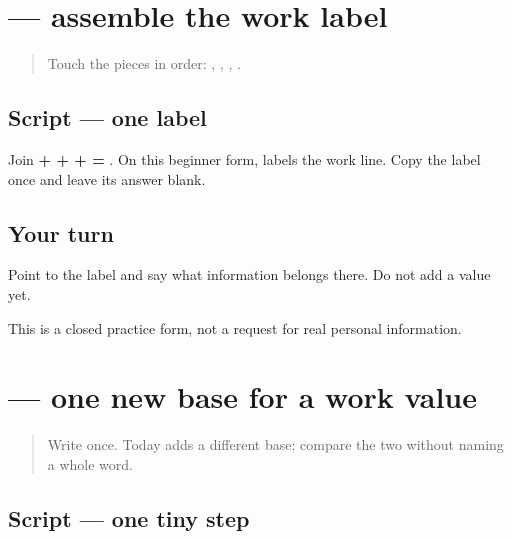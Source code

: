 \section[\texorpdfstring{\pa{ਕੰਮ} (kamm)}{ਕੰਮ (kamm)}]{ — assemble the work label}

\label{lesson:PA-W05-work-label}



\begin{quote}
Touch the pieces in order: \textbf{}, \textbf{}, \textbf{}, \textbf{}.
\end{quote}

\subsection*{Script — one label}
Join \textbf{ +  +  +  = }. On this beginner form, \textbf{} labels the work line. Copy the label once and leave its answer blank.

\subsection*{Your turn}
Point to the label and say what information belongs there. Do not add a value yet.

\begin{tcolorbox}[breakable,colback=teal!4,colframe=teal!35!black,title={Before you move on}]
This is a closed practice form, not a request for real personal information.
\end{tcolorbox}
\section[\texorpdfstring{\pa{ਖ} (kha)}{ਖ (kha)}]{ — one new base for a work value}

\label{lesson:PA-W05-kha}



\begin{quote}
Write \textbf{} once. Today adds a different base; compare the two without naming a whole word.
\end{quote}

\subsection*{Script — one tiny step}

